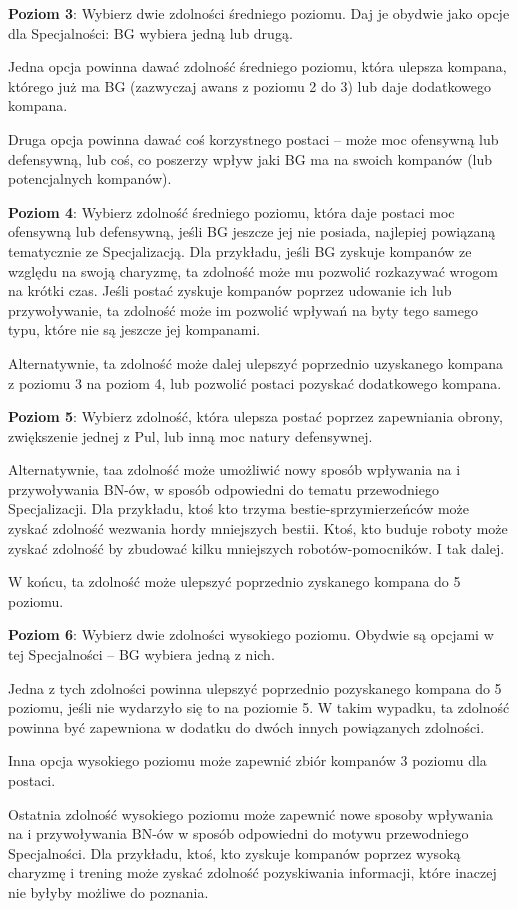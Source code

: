 \textbf{Poziom 3}: Wybierz dwie zdolności średniego poziomu. Daj je obydwie jako opcje dla Specjalności: BG wybiera jedną lub drugą.

Jedna opcja powinna dawać zdolność średniego poziomu, która ulepsza kompana, którego już ma BG (zazwyczaj awans z poziomu 2 do 3) lub daje dodatkowego kompana.

Druga opcja powinna dawać coś korzystnego postaci – może moc ofensywną lub defensywną, lub coś, co poszerzy wpływ jaki BG ma na swoich kompanów (lub potencjalnych kompanów).

\textbf{Poziom 4}: Wybierz zdolność średniego poziomu, która daje postaci moc ofensywną lub defensywną, jeśli BG jeszcze jej nie posiada, najlepiej powiązaną tematycznie ze Specjalizacją. Dla przykładu, jeśli BG zyskuje kompanów ze względu na swoją charyzmę, ta zdolność może mu pozwolić rozkazywać wrogom na krótki czas. Jeśli postać zyskuje kompanów poprzez udowanie ich lub przywoływanie, ta zdolność może im pozwolić wpływań na byty tego samego typu, które nie są jeszcze jej kompanami.

Alternatywnie, ta zdolność może dalej ulepszyć poprzednio uzyskanego kompana z poziomu 3 na poziom 4, lub pozwolić postaci pozyskać dodatkowego kompana.

\textbf{Poziom 5}: Wybierz zdolność, która ulepsza postać poprzez zapewniania obrony, zwiększenie jednej z Pul, lub inną moc natury defensywnej.

Alternatywnie, taa zdolność może umożliwić nowy sposób wpływania na i przywoływania BN-ów, w sposób odpowiedni do tematu przewodniego Specjalizacji. Dla przykładu, ktoś kto trzyma bestie-sprzymierzeńców może zyskać zdolność wezwania hordy mniejszych bestii. Ktoś, kto buduje roboty może zyskać zdolność by zbudować kilku mniejszych robotów-pomocników. I tak dalej.

W końcu, ta zdolność może ulepszyć poprzednio zyskanego kompana do 5 poziomu.

\textbf{Poziom 6}: Wybierz dwie zdolności wysokiego poziomu. Obydwie są opcjami w tej Specjalności – BG wybiera jedną z nich.

Jedna z tych zdolności powinna ulepszyć poprzednio pozyskanego kompana do 5 poziomu, jeśli nie wydarzyło się to na poziomie 5. W takim wypadku, ta zdolność powinna być zapewniona w dodatku do dwóch innych powiązanych zdolności.

Inna opcja wysokiego poziomu może zapewnić zbiór kompanów 3 poziomu dla postaci.

Ostatnia zdolność wysokiego poziomu może zapewnić nowe sposoby wpływania na i przywoływania BN-ów w sposób odpowiedni do motywu przewodniego Specjalności. Dla przykładu, ktoś, kto zyskuje kompanów poprzez wysoką charyzmę i trening może zyskać zdolność pozyskiwania informacji, które inaczej nie byłyby możliwe do poznania.